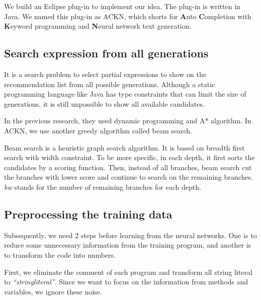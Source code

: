 \documentclass[PRO,english]{ipsj}
\begin{document}
We build an Eclipse plug-in to implement our idea. The plug-in is written in Java. We named this plug-in as ACKN, which shorts for \textbf{A}uto \textbf{C}ompletion with \textbf{K}eyword programming and \textbf{N}eural network text generation.

\subsection{Search expression from all generations}
It is a search problem to select partial expressions to show on the recommendation list from all possible generations. Although a static programming language like Java has type constraints that can limit the size of generations, it is still unpossible to show all available candidates.

In the previous research, they used dynamic programming and A* algorithm. In ACKN, we use another greedy algorithm called beam search.

Beam search is a heuristic graph search algorithm. It is based on breadth first search with width constraint. To be more specific, in each depth, it first sorts the candidates by a scoring function. Then, instead of all branches, beam search cut the branches with lower score and continue to search on the remaining branches. \textit{bw} stands for the number of remaining branches for each depth.


\subsection{Preprocessing the training data}
\label{subsection:Preprocessing}
Subsequently, we need 2 steps before learning from the neural networks. One is to reduce some unnecessary information from the training program, and another is to transform the code into numbers.

First, we eliminate the comment of each program and transform all string literal to \textit{``stringliteral''}. Since we want to focus on the information from methods and variables, we ignore these noise.
\end{document}
